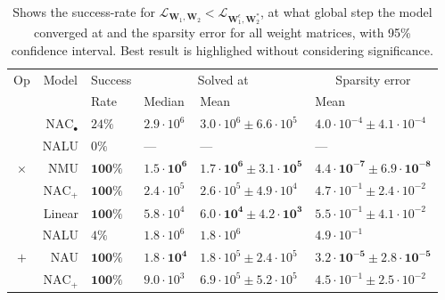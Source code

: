 \begin{table}[!h]

\caption{\label{tab:function-task-static-defaults}Shows the success-rate for $\mathcal{L}_{\mathbf{W}_1, \mathbf{W}_2} < \mathcal{L}_{\mathbf{W}_1^\epsilon, \mathbf{W}_2^*}$, at what global step the model converged at and the sparsity error for all weight matrices, with 95\% confidence interval. Best result is highlighed without considering significance.}
\centering
\begin{tabular}{crllll}
\toprule
\multicolumn{1}{c}{Op} & \multicolumn{1}{c}{Model} & \multicolumn{1}{c}{Success} & \multicolumn{2}{c}{Solved at} & \multicolumn{1}{c}{Sparsity error} \\
\cmidrule(l{3pt}r{3pt}){1-1} \cmidrule(l{3pt}r{3pt}){2-2} \cmidrule(l{3pt}r{3pt}){3-3} \cmidrule(l{3pt}r{3pt}){4-5} \cmidrule(l{3pt}r{3pt}){6-6}
 &  & Rate & Median & Mean & Mean\\
\midrule
 & $\mathrm{NAC}_{\bullet}$ & $24\%$ & $2.9 \cdot 10^{6}$ & $3.0 \cdot 10^{6} \pm 6.6 \cdot 10^{5}$ & $4.0 \cdot 10^{-4} \pm 4.1 \cdot 10^{-4}$\\

 & NALU & $0\%$ & --- & --- & ---\\

\multirow{-3}{*}{\centering\arraybackslash $\bm{\times}$} & NMU & $\mathbf{100\%}$ & $\mathbf{1.5 \cdot 10^{6}}$ & $\mathbf{1.7 \cdot 10^{6} \pm 3.1 \cdot 10^{5}}$ & $\mathbf{4.4 \cdot 10^{-7} \pm 6.9 \cdot 10^{-8}}$\\
\cmidrule{1-6}
 & $\mathrm{NAC}_{+}$ & $\mathbf{100\%}$ & $2.4 \cdot 10^{5}$ & $2.6 \cdot 10^{5} \pm 4.9 \cdot 10^{4}$ & $4.7 \cdot 10^{-1} \pm 2.4 \cdot 10^{-2}$\\

 & Linear & $\mathbf{100\%}$ & $5.8 \cdot 10^{4}$ & $\mathbf{6.0 \cdot 10^{4} \pm 4.2 \cdot 10^{3}}$ & $5.5 \cdot 10^{-1} \pm 4.1 \cdot 10^{-2}$\\

 & NALU & $4\%$ & $1.8 \cdot 10^{6}$ & $1.8 \cdot 10^{6}$ & $4.9 \cdot 10^{-1}$\\

\multirow{-4}{*}{\centering\arraybackslash $\bm{+}$} & NAU & $\mathbf{100\%}$ & $\mathbf{1.8 \cdot 10^{4}}$ & $1.8 \cdot 10^{5} \pm 2.4 \cdot 10^{5}$ & $\mathbf{3.2 \cdot 10^{-5} \pm 2.8 \cdot 10^{-5}}$\\
\cmidrule{1-6}
 & $\mathrm{NAC}_{+}$ & $\mathbf{100\%}$ & $9.0 \cdot 10^{3}$ & $6.9 \cdot 10^{5} \pm 5.2 \cdot 10^{5}$ & $4.5 \cdot 10^{-1} \pm 2.5 \cdot 10^{-2}$\\


\end{tabular}
\end{table}
